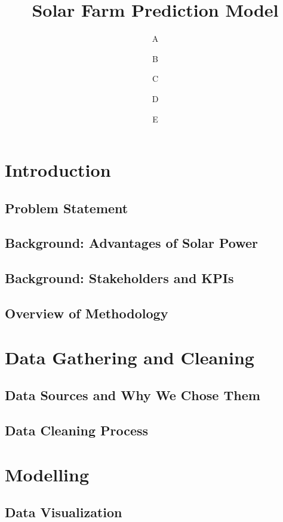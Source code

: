 \documentclass[review,onefignum,onetabnum,twoside]{siamart220329}
\title{Solar Farm Prediction Model}
\date{}
\author{
A
\and
B
\and
C
\and
D
\and 
E
}
\begin{document}
\maketitle

\section{Introduction}
\label{sec:intro}

\subsection{Problem Statement}
\label{subsec:prob}

\subsection{Background: Advantages of Solar Power}
\label{subsec:back_adv}

\subsection{Background: Stakeholders and KPIs}
\label{subsec:back_stake}

\subsection{Overview of Methodology}
\label{subsec:method_ovv}


\section{Data Gathering and Cleaning}
\label{sec:data}

\subsection{Data Sources and Why We Chose Them}
\label{subsec:data_src}

\subsection{Data Cleaning Process}
\label{subsec:data_clean}


\section{Modelling}
\label{sec:model}

\subsection{Data Visualization}
\label{subsec:data_viz}
\end{document}
